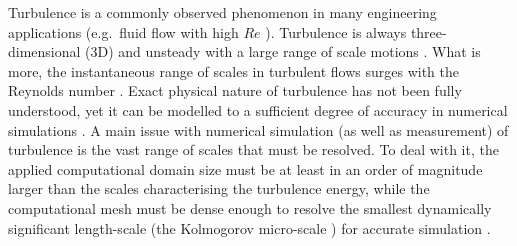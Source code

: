 


Turbulence is a commonly observed phenomenon in many engineering applications (e.g.\ fluid flow with high $ Re $ \cite{princetonTransiTur}). Turbulence is always three-dimensional (3D) and unsteady with a large range of scale motions \cite{Zhiyin2015}. What is more, the instantaneous range of scales in turbulent flows surges with the Reynolds number \cite{Moin1998}. Exact physical nature of turbulence has not been fully understood, yet it can be modelled to a sufficient degree of accuracy in numerical simulations \cite{Zhiyin2015}. A main issue with numerical simulation (as well as measurement) of turbulence is the vast range of scales that must be resolved. To deal with it, the applied computational domain size must be at least in an order of magnitude larger than the scales characterising the turbulence energy, while the computational mesh must be dense enough to resolve the smallest dynamically significant length-scale (the Kolmogorov micro-scale \cite{Landahl1992}) for accurate simulation \cite{Zhiyin2015}. 

